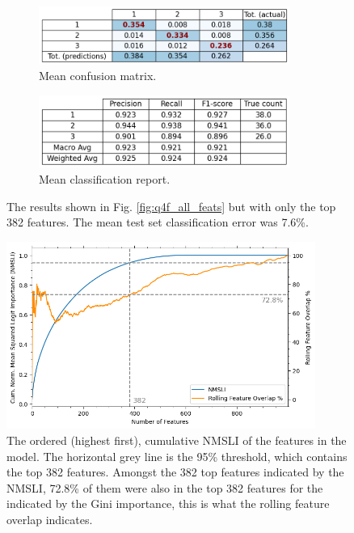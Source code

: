     \begin{figure}[htb]
    \centering
    \begin{subfigure}{0.5\textwidth}
        \centering
        \includegraphics[width=0.9\textwidth]{./figures/q4f_confusion_matrix_reduced_feats}
        \caption{Mean confusion matrix.}
        \label{fig:q4f_confusion_matrix_reduced_feats}
    \end{subfigure}%
    \begin{subfigure}{0.5\textwidth}
        \centering
        \includegraphics[width=0.9\textwidth]{./figures/q4f_classification_report_reduced_feats}
        \caption{Mean classification report.}
        \label{fig:q4f_classification_report_reduced_feats}
    \end{subfigure}
    \caption{The results shown in Fig. \eqref{fig:q4f_all_feats} but with only the top 382 features.
        The mean test set classification error was 7.6\%.}
    \label{fig:q4f_reduced_feats}
    \end{figure}

    \begin{figure}[htb]
    \centering
    \includegraphics[width=0.9\textwidth]{./figures/q4f_logit_importance}
    \caption{The ordered (highest first), cumulative NMSLI of the features in the  model.
        The horizontal grey line is the 95\% threshold, which contains the top 382 features. Amongst the 382 top features
        indicated by the NMSLI, 72.8\% of them were also in the top 382 features for the 
        indicated by the Gini importance, this is what the rolling feature overlap indicates.}
        \label{fig:q4f_logit_importance}
    \end{figure}

